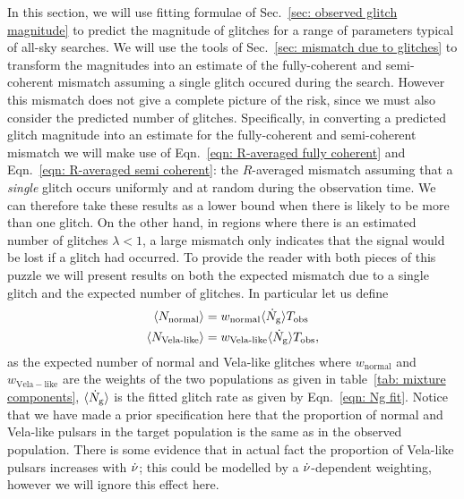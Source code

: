 \documentclass[../full_thesis/full_thesis.tex]{subfiles}
\begin{document}
In this section, we will use fitting formulae of Sec.~\ref{sec: observed glitch
magnitude} to predict the magnitude of glitches for a range of parameters
typical of all-sky searches. We will use the tools of Sec.~\ref{sec: mismatch
due to glitches} to transform the magnitudes into an estimate of the
fully-coherent and semi-coherent mismatch assuming a single glitch occured
during the search. However this mismatch does not give a complete picture of
the risk, since we must also consider the predicted number of glitches.
Specifically, in converting a predicted glitch magnitude into an estimate for
the fully-coherent and semi-coherent mismatch we will make use of
Eqn.~\eqref{eqn: R-averaged fully coherent} and Eqn.~\eqref{eqn: R-averaged
semi coherent}: the $R$-averaged mismatch assuming that a \emph{single} glitch
occurs uniformly and at random during the observation time. We can therefore
take these results as a lower bound when there is likely to be more than one
glitch. On the other hand, in regions where there is an estimated number of
glitches $\lambda < 1$, a large mismatch only indicates that the signal would
be lost if a glitch had occurred. To provide the reader with both pieces of
this puzzle we will present results on both the expected mismatch due to a
single glitch and the expected number of glitches. In particular let us define
\begin{align}
\begin{split}
\langle N_{\textrm{normal}} \rangle & = w_\textrm{normal}\langle \dot{N}_{\textrm{g}}\rangle T_{\mathrm{obs}} \\
\langle N_{\textrm{Vela-like}} \rangle & = w_\textrm{Vela-like}\langle \dot{N}_{\textrm{g}}\rangle T_{\mathrm{obs}},
\end{split}
\label{eqn: N}
\end{align}
as the expected number of normal and Vela-like glitches where $w_\mathrm{normal}$
and $w_\mathrm{Vela-like}$ are the weights of the two populations as given in
table~\ref{tab: mixture components}, $\langle \dot{N}_{\textrm{g}}\rangle$ is the fitted glitch rate as
given by Eqn.~\eqref{eqn: Ng fit}. Notice that we have made a prior specification
here that the proportion of normal and Vela-like pulsars in the target population
is the same as in the observed population. There is some evidence that in actual
fact the proportion of Vela-like pulsars increases with $\dot{\nu}$; this could
be modelled by a $\dot{\nu}$-dependent weighting, however we will ignore this
effect here.
\end{document}
